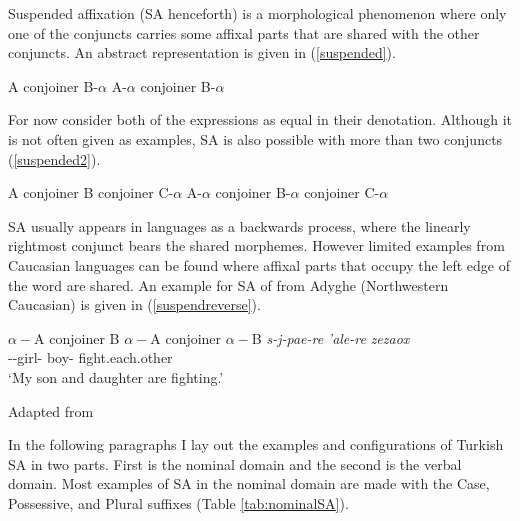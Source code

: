 
Suspended affixation (SA henceforth) is a morphological phenomenon where only one of the conjuncts carries some affixal parts that are shared with the other conjuncts. An abstract representation is given in (\ref{suspended}).
\begin{exe}
\ex \label{suspended}
\begin{xlist}
\ex \label{suspended1} A conjoiner B-$\alpha$
\ex A-$\alpha$ conjoiner B-$\alpha$
\end{xlist}
\end{exe}
For now consider both of the expressions as equal in their denotation. Although it is not often given as examples, SA is also possible with more than two conjuncts (\ref{suspended2}).
\begin{exe}
\ex \label{suspended2}
\begin{xlist}
\ex A conjoiner B conjoiner C-$\alpha$
\ex A-$\alpha$ conjoiner B-$\alpha$ conjoiner C-$\alpha$
\end{xlist}
\end{exe}
SA usually appears in languages as a backwards process, where the linearly rightmost conjunct bears the shared morphemes. However limited examples from Caucasian languages can be found \citep{erschler2012suspended, erschler2009possession} where affixal parts that occupy the left edge of the word are shared. An example for SA of {\All} from Adyghe (Northwestern Caucasian) is given in (\ref{suspendreverse}).
\begin{exe}
\ex \label{suspendreverse}
    \begin{xlist}
        \ex $\alpha-$A conjoiner B
        \ex $\alpha-$A conjoiner $\alpha-$B
        \ex \gll 
        \textit{s-j\textschwa-p\textctc a\textctc e-re} \textit{\textteshlig'ale-re} \textit{zezaox} \\ {\First}{\Sg}-{\All}-girl-{\And} boy-{\And} fight.each.other \\
        \glt `My son and daughter are fighting.'
    \end{xlist}
\hfill Adapted from \cite{erschler2012suspended}
\end{exe}

In the following paragraphs I lay out the examples and configurations of Turkish SA in two parts. First is the nominal domain and the second is the verbal domain. Most examples of SA in the nominal domain are made with the Case, Possessive, and Plural suffixes (Table \ref{tab:nominalSA}).

